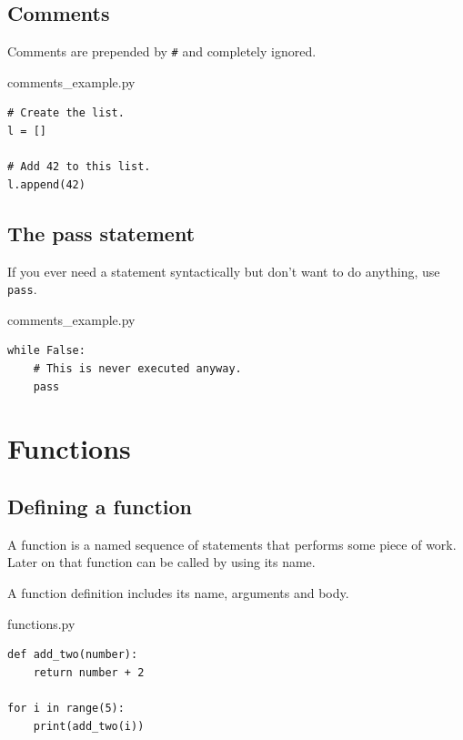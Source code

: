 \documentclass[aspectratio=1610,slidestop]{beamer}
\begin{document}
\subsection{Comments}
\begin{pframe}
 Comments are prepended by \texttt{\#} and completely ignored.
 \begin{pythonfile}{comments\_example.py}
  \begin{verbatim}
# Create the list.
l = []

# Add 42 to this list.
l.append(42)
  \end{verbatim}
 \end{pythonfile}
\end{pframe}


\subsection{The pass statement}
\begin{pframe}
 If you ever need a statement syntactically but don't want to do anything, use \texttt{pass}.
 \begin{pythonfile}{comments\_example.py}
  \begin{verbatim}
while False:
    # This is never executed anyway.
    pass
  \end{verbatim}
 \end{pythonfile}
\end{pframe}



\section{Functions}

\subsection{Defining a function}
\begin{pframe}
 A function is a named sequence of statements that performs some piece of work.
 Later on that function can be called by using its name.
 \medskip

 A function definition includes its name, arguments and body.
 \begin{pythonfile}{functions.py}
  \begin{verbatim}
def add_two(number):
    return number + 2

for i in range(5):
    print(add_two(i))
  \end{verbatim}
 \end{pythonfile}
\end{pframe}
\end{document}
